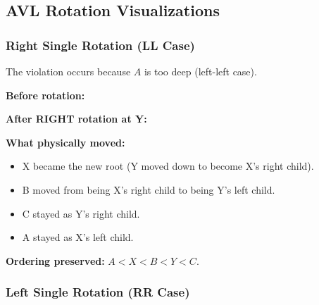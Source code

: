 \documentclass[12pt,portrait]{article}
\begin{document}
\subsection{AVL Rotation Visualizations}

\subsubsection{Right Single Rotation (LL Case)}

\begin{rulebox}[When to Use: Node $Y$ has BF = $+2$, and its left child's BF is $\geq 0$]
The violation occurs because $A$ is too deep (left-left case).

\textbf{Before rotation:}
\begin{center}
\end{center}

\textbf{After RIGHT rotation at Y:}
\begin{center}
\end{center}

\textbf{What physically moved:} 
\begin{itemize}[leftmargin=*]
    \item X became the new root (Y moved down to become X's right child).
    \item B moved from being X's right child to being Y's left child.
    \item C stayed as Y's right child.
    \item A stayed as X's left child.
\end{itemize}
\textbf{Ordering preserved:} $A < X < B < Y < C$.
\end{rulebox}

\subsubsection{Left Single Rotation (RR Case)}
\end{document}
